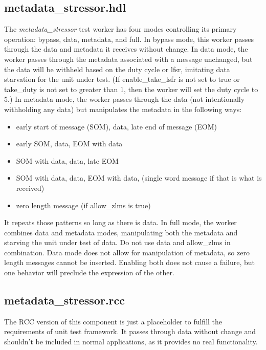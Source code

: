 \documentclass{article}
\def\comp{metadata\_stressor}
\begin{document}
\subsection*{\comp.hdl}
\begin{flushleft}
The \textit{\comp} test worker has four modes controlling its primary operation: bypass, data, metadata, and full. In bypass mode, this worker passes through the data and metadata it receives without change. In data mode, the worker passes through the metadata associated with a message unchanged, but the data will be withheld based on the duty cycle or lfsr, imitating data starvation for the unit under test. (If enable\_take\_lsfr is not set to true or take\_duty is not set to greater than 1, then the worker will set the duty cycle to 5.) In metadata mode, the worker passes through the data (not intentionally withholding any data) but manipulates the metadata in the following ways:
\begin{itemize}
 \item early start of message (SOM), data, late end of message (EOM)
 \item early SOM, data, EOM with data
 \item SOM with data, data, late EOM
 \item SOM with data, data, EOM with data, (single word message if that is what is received)
 \item zero length message (if allow\_zlms is true)
\end{itemize}
It repeats those patterns so long as there is data.
In full mode, the worker combines data and metadata modes, manipulating both the metadata and starving the unit under test of data.
Do not use data and allow\_zlms in combination. Data mode does not allow for manipulation of metadata, so zero length messages cannot be inserted. Enabling both does not cause a failure, but one behavior will preclude the expression of the other.  \medskip
\end{flushleft}

\subsection*{\comp.rcc}
\begin{flushleft}
The RCC version of this component is just a placeholder to fulfill the requirements of unit test framework. It passes through data without change and shouldn't be included in normal applications, as it provides no real functionality.  \medskip
\end{flushleft}
\end{document}
